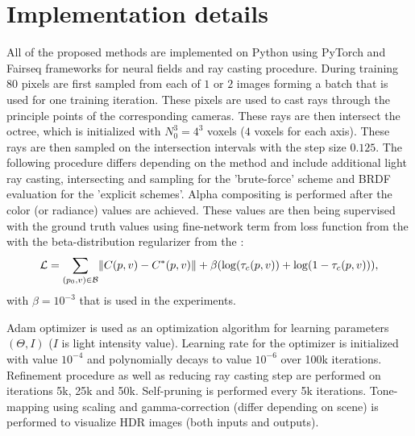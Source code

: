 

\section{Implementation details}

All of the proposed methods are implemented on Python
using PyTorch \cite{pytorch} and Fairseq \cite{ott2019fairseq} frameworks
for neural fields and ray casting procedure.
During training $80$ pixels are first sampled from each of $1$ or $2$ images 
forming a batch that is used for one training iteration.
These pixels are used to cast rays through the principle points of the corresponding cameras.
These rays are then intersect the octree, which is initialized with $N_0^3 = 4^3$ voxels ($4$ voxels for each axis).
These rays are then sampled on the intersection intervals with the step size $0.125$.
The following procedure differs depending on the method
and include additional light ray casting, intersecting and sampling for the 'brute-force' scheme and BRDF evaluation for the 'explicit schemes'.
Alpha compositing is performed after the color (or radiance) values are achieved.
These values are then being supervised with the ground truth values using fine-network term from loss function from the  with the beta-distribution regularizer from the :
\begin{equation}
    \mathcal{L} = \sum_{(p_0,v)\in\mathcal{B}} \norm{ C(p, v) - C^*(p, v) } + \beta(\log(\tau_c(p, v)) + \log(1 - \tau_c(p, v))),
\end{equation}
with $\beta = 10^{-3}$ that is used in the experiments.

Adam optimizer is used as an optimization algorithm for learning parameters $(\Theta, I)$ ($I$ is light intensity value).
Learning rate for the optimizer is initialized with value $10^{-4}$
and polynomially decays to value $10^{-6}$ over 100k iterations.
Refinement procedure as well as reducing ray casting step are performed on iterations 5k, 25k and 50k.
Self-pruning is performed every 5k iterations.
Tone-mapping using scaling and gamma-correction (differ depending on scene)
is performed to visualize HDR images (both inputs and outputs).

